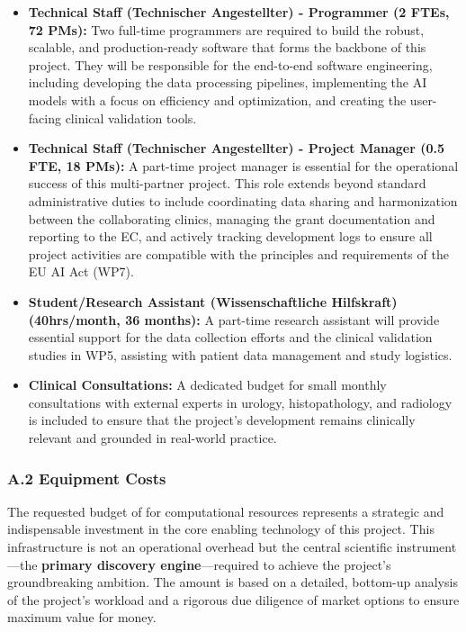 \begin{itemize}
    \item \textbf{Technical Staff (Technischer Angestellter) - Programmer (2 FTEs, 72 PMs):} Two full-time programmers are required to build the robust, scalable, and production-ready software that forms the backbone of this project. They will be responsible for the end-to-end software engineering, including developing the data processing pipelines, implementing the AI models with a focus on efficiency and optimization, and creating the user-facing clinical validation tools.
    \item \textbf{Technical Staff (Technischer Angestellter) - Project Manager (0.5 FTE, 18 PMs):} A part-time project manager is essential for the operational success of this multi-partner project. This role extends beyond standard administrative duties to include coordinating data sharing and harmonization between the collaborating clinics, managing the grant documentation and reporting to the EC, and actively tracking development logs to ensure all project activities are compatible with the principles and requirements of the EU AI Act (WP7).
    \item \textbf{Student/Research Assistant (Wissenschaftliche Hilfskraft) (40hrs/month, 36 months):} A part-time research assistant will provide essential support for the data collection efforts and the clinical validation studies in WP5, assisting with patient data management and study logistics.
    \item \textbf{Clinical Consultations:} A dedicated budget for small monthly consultations with external experts in urology, histopathology, and radiology is included to ensure that the project's development remains clinically relevant and grounded in real-world practice.
\end{itemize}

\subsubsection*{A.2 Equipment Costs}
The requested budget of  for computational resources represents a strategic and indispensable investment in the core enabling technology of this project. This infrastructure is not an operational overhead but the central scientific instrument—the \textbf{primary discovery engine}—required to achieve the project's groundbreaking ambition. The amount is based on a detailed, bottom-up analysis of the project's workload and a rigorous due diligence of market options to ensure maximum value for money.

